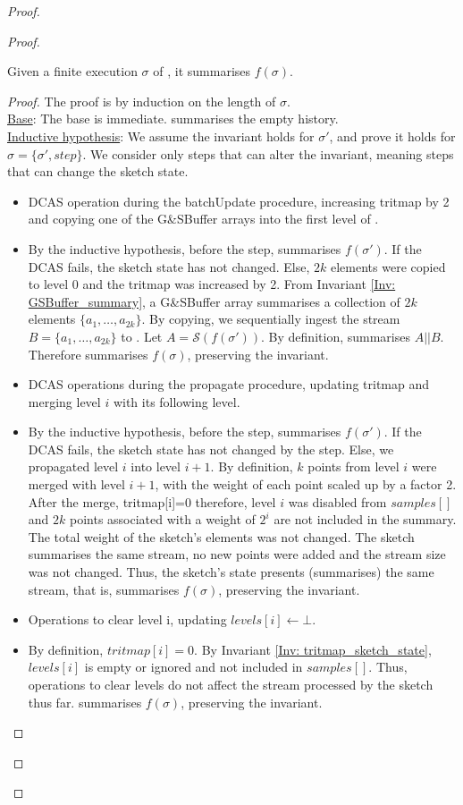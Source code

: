 \begin{proof}
\begin{proof}
\begin{invariant}\label{Inv: summary_history}
Given a finite execution $\sigma$ of \mysketch, it summarises \(f(\sigma)\).
\end{invariant}
\begin{proof}
The proof is by induction on the length of \(\sigma\).\\
\underline{Base}: The base is immediate. \mysketch summarises the empty history.\\
\underline{Inductive hypothesis}: We assume the invariant holds for \(\sigma'\), and prove it holds for \(\sigma = \{\sigma',step\}\). We consider only steps that can alter the invariant, meaning steps that can change the sketch state.
\begin{itemize}
    \item DCAS operation during the batchUpdate procedure, increasing tritmap by 2 and copying one of the G\&SBuffer arrays into the first level of \mysketch.
    \item[] By the inductive hypothesis, before the step, \mysketch summarises \(f(\sigma')\). If the DCAS fails, the sketch state has not changed. Else, $2k$ elements were copied to level 0 and the tritmap was increased by 2. 
    From Invariant \ref{Inv: GSBuffer_summary}, a G\&SBuffer array summarises a collection of \(2k\) elements \(\{a_1,\dots,a_{2k}\}\). By copying, we sequentially ingest the stream \(B=\{a_1,\dots,a_{2k}\}\) to \mysketch. Let \(A=\mathcal{S}(f(\sigma'))\). By definition, \mysketch summarises \(A||B\). Therefore \mysketch summarises \(f(\sigma)\), preserving the invariant. 
    \item DCAS operations during the propagate procedure, updating tritmap and merging level \(i\) with its following level.
    \item[] By the inductive hypothesis, before the step, \mysketch summarises \(f(\sigma')\). If the DCAS fails, the sketch state has not changed by the step. Else, we propagated level \(i\) into level \(i+1\). By definition, \(k\) points from level \(i\) were merged with level \(i+1\), with the weight of each point scaled up by a factor 2. After the merge, tritmap[i]=0 therefore, level \(i\) was disabled from \(samples[]\) and \(2k\) points associated with a weight of \(2^i\) are not included in the summary. The total weight of the sketch's elements was not changed. The sketch summarises the same stream, no new points were added and the stream size was not changed. Thus, the sketch's state presents (summarises) the same stream, that is, \mysketch summarises \(f(\sigma)\), preserving the invariant. 
    \item Operations to clear level i, updating \(levels[i] \gets \bot\).
    \item[] By definition, \(tritmap[i] = 0\). By Invariant \ref{Inv: tritmap_sketch_state}, \(levels[i]\) is empty or ignored and not included in \(samples[]\). Thus, operations to clear levels do not affect the stream processed by the sketch thus far. \mysketch summarises \(f(\sigma)\), preserving the invariant.
\end{itemize}
\end{proof}


\end{proof}
\end{proof}
